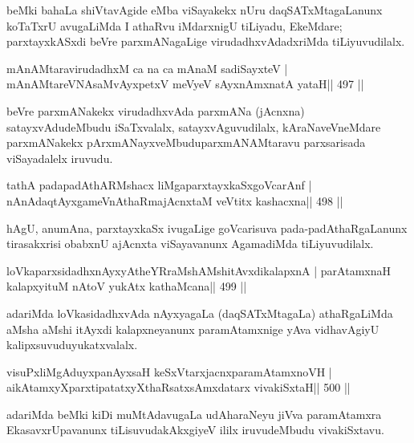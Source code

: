 \begin{artha}
beMki bahaLa shiVtavAgide eMba viSayakekx nUru daqSATxMtagaLanunx koTaTxrU avugaLiMda I athaRvu iMdarxnigU tiLiyadu, EkeMdare; parxtayxkASxdi beVre parxmANagaLige virudadhxvAdadxriMda tiLiyuvudilalx.
\end{artha}

\begin{shl}
mAnAMtaravirudadhxM ca na ca mAnaM sadiSayxteV |
mAnAMtareVNAsaMvAyxpetxV meVyeV sAyxnAmxnatA yataH\hfill || 497 ||
\end{shl}

\begin{artha}
beVre parxmANakekx virudadhxvAda parxmANa (jAcnxna) satayxvAdudeMbudu iSaTxvalalx, satayxvAguvudilalx, kAraNaveVneMdare parxmANakekx pArxmANayxveMbudu\break parxmANAMtaravu parxsarisada viSayadalelx iruvudu.
\end{artha}

\begin{shl}
tathA padapadAthARMshacx liMgaparxtayxkaSxgoVcarAnf |
nAnAdaqtAyx\s\s gameVnAthaRmajAcnxtaM veVtitx kashacxna\hfill || 498 ||
\end{shl}

\begin{artha}
hAgU, anumAna, parxtayxkaSx ivugaLige goVcarisuva pada-padAthaRgaLanunx tirasakxrisi obabxnU ajAcnxta viSayavanunx AgamadiMda tiLiyuvudilalx.
\end{artha}

\begin{shl}
loVkaparxsidadhxnAyxyAtheYRraMshAMshitAvxdikalapxnA |
parAtamxnaH kalapxyituM nAtoV yukAtx kathaMcana\hfill || 499 ||
\end{shl}

\begin{artha}
adariMda loVkasidadhxvAda nAyxyagaLa (daqSATxMtagaLa) athaRgaLiMda aMsha aMshi itAyxdi kalapxneyanunx paramAtamxnige yAva vidhavAgiyU kalipxsuvudu\break yukatxvalalx.
\end{artha}



\begin{shl}
visuPxliMgAduyxpanAyxsaH keSxVtarxjacnxparamAtamxnoVH |
aikAtamxyXparxtipatatxyXthaRsatxsAmxdatarx vivakiSxtaH\hfill || 500 ||
\end{shl}

\begin{artha}
adariMda beMki kiDi muMtAdavugaLa udAharaNeyu jiVva paramAtamxra EkasavxrUpavanunx tiLisuvudakAkxgiyeV ililx iruvudeMbudu vivakiSxtavu.
\end{artha}

